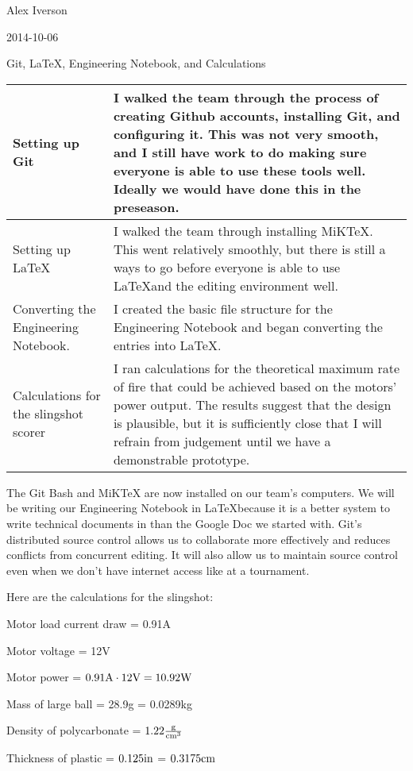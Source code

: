 Alex Iverson

2014-10-06

Git, \LaTeX, Engineering Notebook, and Calculations

\begin{tabular}{|p{5cm}|p{5cm}|}
 \hline
 Setting up Git
 &
 I walked the team through the process of creating Github accounts, installing Git, and configuring it. This was not very smooth, and I still have work to do making sure everyone is able to use these tools well. Ideally we would have done this in the preseason.
 \\
 \hline
 Setting up \LaTeX
 &
 I walked the team through installing MiKTeX. This went relatively smoothly, but there is still a ways to go before everyone is able to use \LaTeX and the editing environment well.
 \\
 \hline
 Converting the Engineering Notebook.
 &
 I created the basic file structure for the Engineering Notebook and began converting the entries into \LaTeX.
 \\
 \hline
 Calculations for the slingshot scorer
 &
 I ran calculations for the theoretical maximum rate of fire that could be achieved based on the motors' power output. The results suggest that the design is plausible, but it is sufficiently close that I will refrain from judgement until we have a demonstrable prototype.
 \\
 \hline
\end{tabular}

The Git Bash and MiKTeX are now installed on our team's computers. We will be writing our Engineering Notebook in \LaTeX because it is a better system to write technical documents in than the Google Doc we started with. Git's distributed source control allows us to collaborate more effectively and reduces conflicts from concurrent editing. It will also allow us to maintain source control even when we don't have internet access like at a tournament.

\medskip 

Here are the calculations for the slingshot:

Motor load current draw = 0.91A

Motor voltage = 12V

Motor power = $0.91\rm{A}\cdot12\rm{V} = 10.92\rm{W}$

Mass of large ball = 28.9g = 0.0289kg

Density of polycarbonate = $1.22\frac{\rm{g}}{\rm{cm}^3}$

Thickness of plastic = $0.125\rm{in}$ = $0.3175\rm{cm}$

